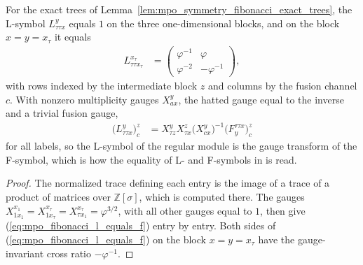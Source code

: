 \begin{lemma}%
    \label{lem:mpo_symmetry_fibonacci_l_symbol}
    \leanok
    For the exact trees of Lemma~\ref{lem:mpo_symmetry_fibonacci_exact_trees},
    the L-symbol $L_{\tau\tau x}^{y}$ equals $1$ on the three
    one-dimensional blocks, and on the block $x=y=x_\tau$ it equals
    \begin{align}
        L_{\tau\tau x_\tau}^{x_\tau} & =
        \begin{pmatrix}
            \varphi^{-1} & \varphi       \\
            \varphi^{-2} & -\varphi^{-1}
        \end{pmatrix},
        \label{eq:mpo_fibonacci_l_symbol}
    \end{align}
    with rows indexed by the intermediate block $z$ and columns by the
    fusion channel $c$. With nonzero multiplicity gauges $X_{ax}^{y}$, the
    hatted gauge equal to the inverse and a trivial fusion gauge,
    \begin{align}
        \bigl(L_{\tau\tau x}^{y}\bigr)_{c}^{z}
         & =X_{\tau z}^{y}X_{\tau x}^{z}\bigl(X_{cx}^{y}\bigr)^{-1}
        \bigl(F^{\tau\tau x}_{y}\bigr)_{c}^{z}
        \label{eq:mpo_fibonacci_l_equals_f}
    \end{align}
    for all labels, so the L-symbol of the regular module is the gauge
    transform of the F-symbol, which is how the equality of L- and F-symbols in
    \cite[Section~3.1]{GarreRubio2023MPOSym} is read.
\end{lemma}

\begin{proof}
    \leanok
    The normalized trace defining each entry is the image of a trace of a
    product of matrices over $\mathbb{Z}[\sigma]$, which is computed
    there. The gauges $X_{1x_1}^{x_1}=X_{1x_\tau}^{x_\tau}
        =X_{\tau x_1}^{x_\tau}=\varphi^{3/2}$, with all other gauges equal
    to $1$, then give (\ref{eq:mpo_fibonacci_l_equals_f}) entry by entry.
    Both sides of (\ref{eq:mpo_fibonacci_l_equals_f}) on the block
    $x=y=x_\tau$ have the gauge-invariant cross ratio $-\varphi^{-1}$.
\end{proof}
